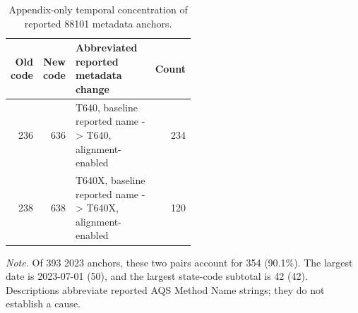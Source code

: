 \begin{table}[tbp]
\centering
\caption{Appendix-only temporal concentration of reported 88101 metadata anchors.}
\label{tab:anchor-concentration}
\footnotesize
\begin{tabular}{rrp{0.52\linewidth}r}
\toprule
Old code & New code & Abbreviated reported metadata change & Count \\
\midrule
236 & 636 & T640, baseline reported name -> T640, alignment-enabled & 234 \\
238 & 638 & T640X, baseline reported name -> T640X, alignment-enabled & 120 \\
\bottomrule
\end{tabular}
\par\smallskip
\begin{minipage}{0.94\linewidth}
\footnotesize\textit{Note.} Of 393 2023 anchors, these two pairs account for 354 (90.1\%). The largest date is 2023-07-01 (50), and the largest state-code subtotal is 42 (42). Descriptions abbreviate reported AQS Method Name strings; they do not establish a cause.
\end{minipage}
\end{table}
